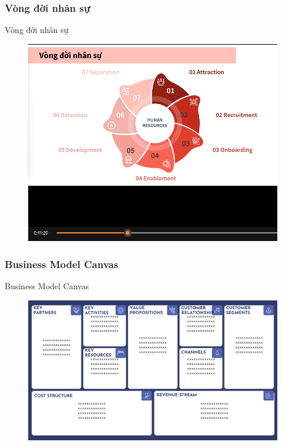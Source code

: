\documentclass{beamer}
\begin{document}
\subsubsection{Vòng đời nhân sự}
\begin{frame}{Vòng đời nhân sự}
\begin{figure}[H]
\centering
\includegraphics[scale = 0.3]{pictures/Vòng đời nhân sự.png}
\end{figure}
\end{frame}
\subsubsection{Business Model Canvas}
\begin{frame}{Business Model Canvas}
\begin{figure}[H]
\centering
\includegraphics[scale = 0.3]{pictures/Business Model Canvas.png}
\end{figure}
\end{frame}
\end{document}
